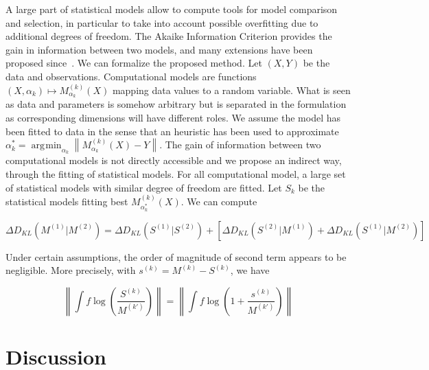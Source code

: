 \documentclass[Royal,sageh,times]{sagej}
\newcommand{\norm}[1]{\left\lVert #1 \right\rVert}
\DeclareMathOperator*{\argmin}{\arg\!\min}
\begin{document}

A large part of statistical models allow to compute tools for model comparison and selection, in particular to take into account possible overfitting due to additional degrees of freedom. The Akaike Information Criterion provides the gain in information between two models, and many extensions have been proposed since~\cite{}.%
We can formalize the proposed method. Let $(X,Y)$ be the data and observations. Computational models are functions $(X,\alpha_k) \mapsto M_{\alpha_k}^{(k)}(X)$ mapping data values to a random variable. What is seen as data and parameters is somehow arbitrary but is separated in the formulation as corresponding dimensions will have different roles. We assume the model has been fitted to data in the sense that an heuristic has been used to approximate $\alpha^{\ast}_k = \argmin_{\alpha_k}\norm{M_{\alpha_k}^{(k)}(X) - Y}$. The gain of information between two computational models is not directly accessible and we propose an indirect way, through the fitting of statistical models. For all computational model, a large set of statistical models with similar degree of freedom are fitted. %
Let $S_k$ be the statistical models fitting best $M^{(k)}_{\alpha^{\ast}_k}(X)$. We can compute

\[
\Delta D_{KL} \left(M^{(1)}|M^{(2)}\right) = \Delta D_{KL} \left(S^{(1)}|S^{(2)}\right) + \left[ \Delta D_{KL} \left(S^{(2)}|M^{(1)}\right) + \Delta D_{KL} \left(S^{(1)}|M^{(2)}\right) \right]
\]

Under certain assumptions, the order of magnitude of second term appears to be negligible. More precisely, with $s^{(k)}=M^{(k)}-S^{(k)}$, we have

\[
\norm{\int f \log{\left(\frac{S^{(k)}}{M^{(k')}}\right)}} = \norm{\int f \log{\left(1 + \frac{s^{(k)}}{M^{(k')}}\right)}}
\]


\section{Discussion}

% 
%
%



\end{document}
